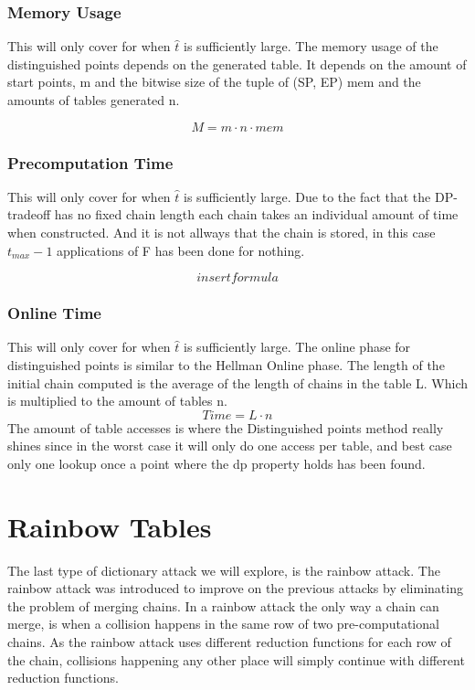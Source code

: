 \subsubsection{Memory Usage}
This will only cover for when $\hat{t}$ is sufficiently large.
The memory usage of the distinguished points depends on the generated table. It depends on the amount of start points, m and the bitwise size of the tuple of (SP, EP) mem and the amounts of tables generated n.

\begin{equation}
  M=m\cdot n\cdot mem
\end{equation}

\subsubsection{Precomputation Time}
This will only cover for when $\hat{t}$ is sufficiently large.
Due to the fact that the DP-tradeoff has no fixed chain length each chain takes an individual amount of time when constructed. And it is not allways that the chain is stored, in this case $t_{max}-1$ applications of F has been done for nothing.

\begin{equation}
  insert formula
\end{equation}

\subsubsection{Online Time}
This will only cover for when $\hat{t}$ is sufficiently large.
The online phase for distinguished points is similar to the Hellman Online phase. The length of the initial chain computed is the average of the length of chains in the table L. Which is multiplied to the amount of tables n.
\begin{equation}
  Time=L\cdot n
\end{equation}
The amount of table accesses is where the Distinguished points method really shines since in the worst case it will only do one access per table, and best case only one lookup once a point where the dp property holds has been found.

\section{Rainbow Tables}
\label{sec:raintheory}

The last type of dictionary attack we will explore, is the rainbow
attack. The rainbow attack was introduced to improve on the previous
attacks by eliminating the problem of merging chains. In a rainbow
attack the only way a chain can merge, is when a collision happens in
the same row of two pre-computational chains. As the rainbow attack uses different
reduction functions for each row of the chain, collisions happening
any other place will simply continue with different reduction
functions.

